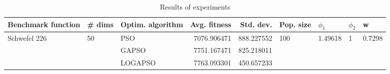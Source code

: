 \begin{table}
\centering
\caption{Results of experiments}
\begin{tabular}{lllrrllll}
\toprule
           Benchmark function &             \# dims & Optim. algorithm &  Avg. fitness &  Std. dev. &            Pop. size &               $\phi_{1}$ &         $\phi_{2}$ &                       w \\
\midrule
\multirow{3}{*}{Schwefel 226} & \multirow{3}{*}{50} &              PSO &   7076.906471 & 888.227552 & \multirow{3}{*}{100} & \multirow{3}{*}{1.49618} & \multirow{3}{*}{1} & \multirow{3}{*}{0.7298} \\
                              &                     &            GAPSO &   7751.167471 & 825.218011 &                      &                          &                    &                         \\
                              &                     &          LOGAPSO &   7763.093301 & 450.657233 &                      &                          &                    &                         \\
\bottomrule
\end{tabular}
\end{table}
